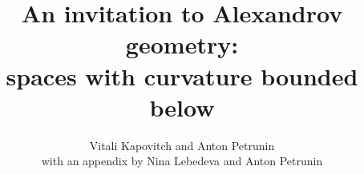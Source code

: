 \documentclass[twoside]{book}
\newcommand{\spell}[2]{#2} %
\def\thetitle{An invitation to Alexandrov geometry:\\
spaces with curvature bounded below}
\def\theauthors{Vitali Kapovitch and Anton Petrunin}
\begin{document}
\spell{\pagestyle{empty}\renewcommand\includegraphics[2][{}]{}\def\emph{\textit}\renewcommand\footnote[1]{\ (#1)}\renewcommand\z{}\renewcommand\section[1]{SECTION. {#1} SECTION.}}{}

\frontmatter
\title{\thetitle}
\author{\theauthors\\
with an appendix by
Nina Lebedeva and Anton Petrunin}
\date{}
\maketitle
\thispagestyle{empty}

\mainmatter
\newpage
\tableofcontents





%











%



\appendix




%

\backmatter



{


\def\emph{\textit}

\printbibliography[heading=bibintoc]
\fussy
}
\end{document}
